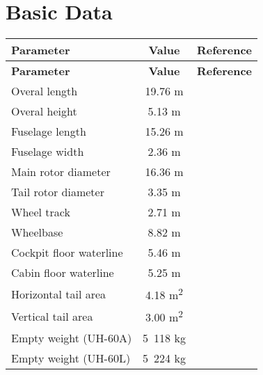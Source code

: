 \section{Basic Data}

\begin{tabularx}{\textwidth}{ | L | c | c | }
  \hline
  \textbf{Parameter}                    & \textbf{Value}   & \textbf{Reference} \\ \hline
  \endfirsthead
  \hline
  \textbf{Parameter}                    & \textbf{Value}   & \textbf{Reference} \\ \hline
  \endhead
  Overal length                         & 19.76 m          &  \cite{Janes20042005,NASA-CR-166309} \\ \hline
  Overal height                         & 5.13 m           &  \cite{Janes20042005} \\ \hline
  Fuselage length                       & 15.26 m          & \cite{Janes20042005,NASA-CR-166309} \\ \hline
  Fuselage width                        & 2.36 m           & \cite{UH60_OperatorsManual,Janes20042005} \\ \hline
  Main rotor diameter                   & 16.36 m          & \cite{Janes20042005,UH60_OperatorsManual} \\ \hline
  Tail rotor diameter                   & 3.35 m           & \cite{Janes20042005,UH60_OperatorsManual} \\ \hline
  Wheel track                           & 2.71 m           & \cite{Janes20042005,NASA-CR-166309} \\ \hline
  Wheelbase                             & 8.82 m           & \cite{Janes20042005,NASA-CR-166309} \\ \hline
  Cockpit floor waterline               & 5.46 m           & \cite{UH60_MaintenanceManual} \\ \hline
  Cabin floor waterline                 & 5.25 m           & \cite{UH60_MaintenanceManual} \\ \hline
  Horizontal tail area                  & 4.18 m\textsuperscript{2} & \cite{Janes20042005,NASA-CR-166309} \\ \hline
  Vertical tail area                    & 3.00 m\textsuperscript{2} & \cite{Janes20042005,NASA-CR-166309} \\ \hline
  Empty weight (UH-60A)                 & 5~118 kg         & \cite{Janes20042005} \\ \hline
  Empty weight (UH-60L)                 & 5~224 kg         & \cite{Janes20042005} \\ \hline

\end{tabularx}
